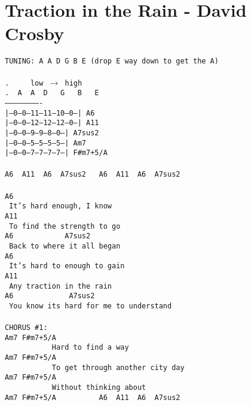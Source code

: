 \newpage
\section{Traction in the Rain - David Crosby}
\label{Traction in the Rain - David Crosby}
\texttt{TUNING:\ A\ A\ D\ G\ B\ E\ (drop\ E\ way\ down\ to\ get\ the\ A)\\
\\
.\ \ \ \ \ low $\rightarrow$ high\\
.\ \ A\ \ A\ \ D\ \ \ G\ \ \ B\ \ \ E\\
-------------------------\\
|--0--0--11--11--10--0--|\ A6\ \ \\
|--0--0--12--12--12--0--|\ A11\ \ \\
|--0--0--9---9---8---0--|\ A7sus2\\
|--0--0--5---5---5---5--|\ Am7\ \\
|--0--0--7---7---7---7--|\ F\#m7+5/A\\
\\
A6\ \ A11\ \ A6\ \ A7sus2\ \ \ A6\ \ A11\ \ A6\ \ A7sus2\\
\\
A6\\
\ It's\ hard\ enough,\ I\ know\\
A11\\
\ To\ find\ the\ strength\ to\ go\\
A6\ \ \ \ \ \ \ \ \ \ \ \ A7sus2\\
\ Back\ to\ where\ it\ all\ began\\
A6\\
\ It's\ hard\ to\ enough\ to\ gain\\
A11\\
\ Any\ traction\ in\ the\ rain\\
A6\ \ \ \ \ \ \ \ \ \ \ \ \ A7sus2\\
\ You\ know\ its\ hard\ for\ me\ to\ understand\\
\\
CHORUS\ \#1:\\
Am7\ F\#m7+5/A\\
\ \ \ \ \ \ \ \ \ \ \ Hard\ to\ find\ a\ way\\
Am7\ F\#m7+5/A\\
\ \ \ \ \ \ \ \ \ \ \ To\ get\ through\ another\ city\ day\\
Am7\ F\#m7+5/A\\
\ \ \ \ \ \ \ \ \ \ \ Without\ thinking\ about\\
Am7\ F\#m7+5/A\ \ \ \ \ \ \ \ \ \ A6\ \ A11\ \ A6\ \ A7sus2\\
}
